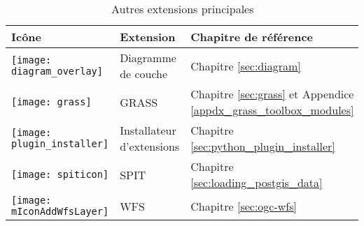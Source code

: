 \begin{table}[H]
\centering
\caption{Autres extensions principales}\label{tab:other_core}\medskip
\small
 \begin{tabular}{|l|l|p{4in}|}
\hline \textbf{Icône} & \textbf{Extension} & \textbf{Chapitre de référence}\\
\hline
\texttt{[image: diagram\_overlay]}
 & Diagramme de couche \index{plugins!diagram} & Chapitre \ref{sec:diagram}\\
\hline
\texttt{[image: grass]}
 & GRASS \index{plugin!grass toolbox} & Chapitre \ref{sec:grass} et Appendice \ref{appdx_grass_toolbox_modules}\\
 \hline
\texttt{[image: plugin\_installer]}
 & Installateur d'extensions \index{plugins!Plugin Installer} & Chapitre \ref{sec:python_plugin_installer}\\
\hline
\texttt{[image: spiticon]}
 & SPIT \index{plugins!spit} & Chapitre \ref{sec:loading_postgis_data} \\
 \hline
\texttt{[image: mIconAddWfsLayer]}
 & WFS & Chapitre \ref{sec:ogc-wfs} \\
\hline
\end{tabular}
\end{table}

